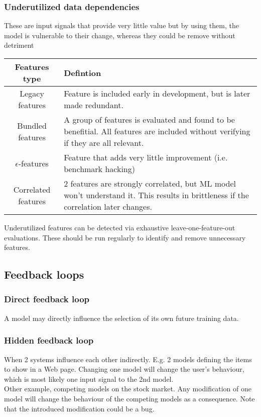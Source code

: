 \documentclass{report}
\begin{document}
\subsubsection{Underutilized data dependencies}
These are input signals that provide very little value
but by using them, the model is vulnerable to their change, whereas they could be remove
without detriment
\begin{center}
    \begin{tabular}{ |c|p{10cm}|}
        \hline
        Features type & Defintion \\
        \hline
        \hline
        Legacy features & Feature is included early in development, but is later made redundant. \\
        \hline
        Bundled features & A group of features is evaluated and found to be benefitial. All features
            are included without verifying if they are all relevant. \\
        \hline
        $\epsilon$-features & Feature that adds very little improvement (i.e. benchmark hacking) \\
        \hline
        Correlated features & 2 features are strongly correlated, but ML model won't understand it.
            This results in brittleness if the correlation later changes.\\
        \hline
    \end{tabular}
\end{center}

Underutilized features can be detected via exhaustive leave-one-feature-out evaluations. These should
be run regularly to identify and remove unnecessary features.

\subsection{Feedback loops}
\subsubsection{Direct feedback loop}
A model may directly influence the selection of its own future training data.

\subsubsection{Hidden feedback loop}
When 2 systems influence each other indirectly. E.g. 2 models defining the items to show in a Web
page. Changing one model will change the user's behaviour, which is most likely one input signal
to the 2nd model. \\
Other example, competing models on the stock market. Any modification of one model will change the
behaviour of the competing models as a consequence. Note that the introduced modification could be
a bug.
\end{document}
